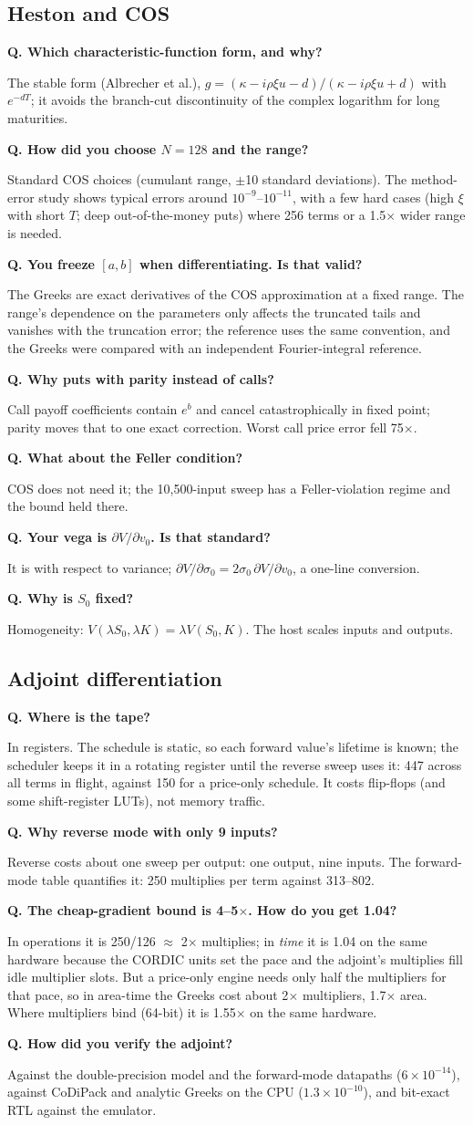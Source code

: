 \documentclass[11pt,a4paper]{article}
\newcounter{qn}
\newcommand{\qa}[2]{\stepcounter{qn}\par\medskip\noindent\textbf{Q\theqn. #1}\par\noindent #2\par}
\begin{document}
\subsection{Heston and COS}
\qa{Which characteristic-function form, and why?}{The stable form (Albrecher et al.), $g=(\kappa-i\rho\xi u-d)/(\kappa-i\rho\xi u+d)$ with $e^{-dT}$; it avoids the branch-cut discontinuity of the complex logarithm for long maturities.}
\qa{How did you choose $N=128$ and the range?}{Standard COS choices (cumulant range, $\pm$10 standard deviations). The method-error study shows typical errors around $10^{-9}$--$10^{-11}$, with a few hard cases (high $\xi$ with short $T$; deep out-of-the-money puts) where 256 terms or a 1.5$\times$ wider range is needed.}
\qa{You freeze $[a,b]$ when differentiating. Is that valid?}{The Greeks are exact derivatives of the COS approximation at a fixed range. The range's dependence on the parameters only affects the truncated tails and vanishes with the truncation error; the reference uses the same convention, and the Greeks were compared with an independent Fourier-integral reference.}
\qa{Why puts with parity instead of calls?}{Call payoff coefficients contain $e^{b}$ and cancel catastrophically in fixed point; parity moves that to one exact correction. Worst call price error fell 75$\times$.}
\qa{What about the Feller condition?}{COS does not need it; the 10,500-input sweep has a Feller-violation regime and the bound held there.}
\qa{Your vega is $\partial V/\partial v_0$. Is that standard?}{It is with respect to variance; $\partial V/\partial\sigma_0 = 2\sigma_0\,\partial V/\partial v_0$, a one-line conversion.}
\qa{Why is $S_0$ fixed?}{Homogeneity: $V(\lambda S_0,\lambda K)=\lambda V(S_0,K)$. The host scales inputs and outputs.}

\subsection{Adjoint differentiation}
\qa{Where is the tape?}{In registers. The schedule is static, so each forward value's lifetime is known; the scheduler keeps it in a rotating register until the reverse sweep uses it: 447 across all terms in flight, against 150 for a price-only schedule. It costs flip-flops (and some shift-register LUTs), not memory traffic.}
\qa{Why reverse mode with only 9 inputs?}{Reverse costs about one sweep per output: one output, nine inputs. The forward-mode table quantifies it: 250 multiplies per term against 313--802.}
\qa{The cheap-gradient bound is 4--5$\times$. How do you get 1.04?}{In operations it is 250/126 $\approx$ 2$\times$ multiplies; in \emph{time} it is 1.04 on the same hardware because the CORDIC units set the pace and the adjoint's multiplies fill idle multiplier slots. But a price-only engine needs only half the multipliers for that pace, so in area-time the Greeks cost about 2$\times$ multipliers, 1.7$\times$ area. Where multipliers bind (64-bit) it is 1.55$\times$ on the same hardware.}
\qa{How did you verify the adjoint?}{Against the double-precision model and the forward-mode datapaths ($6\times10^{-14}$), against CoDiPack and analytic Greeks on the CPU ($1.3\times10^{-10}$), and bit-exact RTL against the emulator.}
\end{document}
